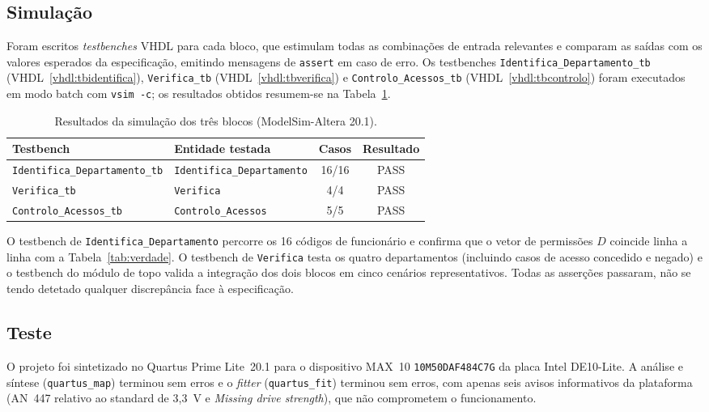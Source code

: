 \documentclass[12pt]{article}
\begin{document}
\subsection{Simulação}
Foram escritos \emph{testbenches} VHDL para cada bloco, que estimulam todas as
combinações de entrada relevantes e comparam as saídas com os valores esperados
da especificação, emitindo mensagens de \texttt{assert} em caso de erro. Os
testbenches \texttt{Identifica\_\allowbreak Departamento\_\allowbreak tb}
(VHDL~\ref{vhdl:tbidentifica}), \texttt{Verifica\_tb}
(VHDL~\ref{vhdl:tbverifica}) e
\texttt{Controlo\_\allowbreak Acessos\_\allowbreak tb}
(VHDL~\ref{vhdl:tbcontrolo}) foram executados em modo batch com
\texttt{vsim -c}; os resultados obtidos resumem-se na Tabela~\ref{tab:sim}.

\begin{table}[!h]\footnotesize
	\centering
	\caption{Resultados da simulação dos três blocos (ModelSim-Altera 20.1).}
	\renewcommand{\arraystretch}{1.2}
	\begin{tabular}{llcc}
	\toprule
	\textbf{Testbench} & \textbf{Entidade testada} & \textbf{Casos} & \textbf{Resultado} \\
	\midrule
	\texttt{Identifica\_Departamento\_tb} & \texttt{Identifica\_Departamento} & 16/16 & PASS \\
	\texttt{Verifica\_tb} & \texttt{Verifica} & 4/4 & PASS \\
	\texttt{Controlo\_Acessos\_tb} & \texttt{Controlo\_Acessos} & 5/5 & PASS \\
	\bottomrule
	\end{tabular}

	\label{tab:sim}
\end{table}

O testbench de \texttt{Identifica\_Departamento} percorre os 16 códigos de
funcionário e confirma que o vetor de permissões $D$ coincide linha a linha com
a Tabela~\ref{tab:verdade}. O testbench de \texttt{Verifica} testa os quatro
departamentos (incluindo casos de acesso concedido e negado) e o testbench do
módulo de topo valida a integração dos dois blocos em cinco cenários
representativos. Todas as asserções passaram, não se tendo detetado qualquer
discrepância face à especificação.

\subsection{Teste}
O projeto foi sintetizado no Quartus Prime Lite~20.1 para o dispositivo MAX~10
\texttt{10M50DAF484C7G} da placa Intel DE10-Lite. A análise e síntese
(\texttt{quartus\_map}) terminou sem erros e o \emph{fitter}
(\texttt{quartus\_fit}) terminou sem erros, com apenas seis avisos
informativos da plataforma (AN~447 relativo ao standard de 3{,}3~V e
\emph{Missing drive strength}), que não comprometem o funcionamento.
\end{document}
